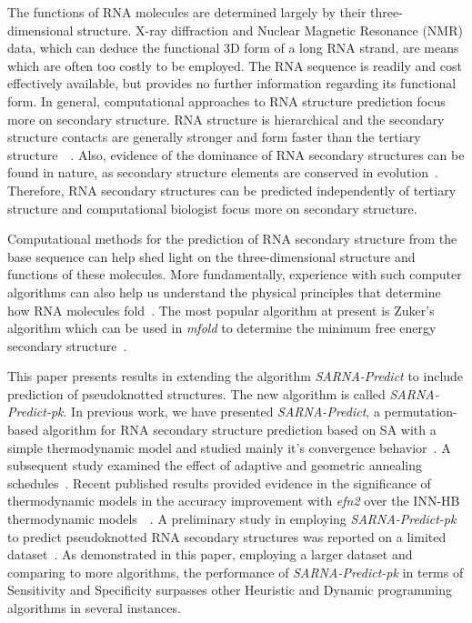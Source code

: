 \documentclass{doublecol-new}
\theoremstyle{TH}{
\newtheorem{lemma}{Lemma}
\newtheorem{theorem}[lemma]{Theorem}
\newtheorem{corrolary}[lemma]{Corrolary}
\newtheorem{conjecture}[lemma]{Conjecture}
\newtheorem{proposition}[lemma]{Proposition}
\newtheorem{claim}[lemma]{Claim}
\newtheorem{stheorem}[lemma]{Wrong Theorem}
\newtheorem{algorithm}{Algorithm}
}
\theoremstyle{THrm}{
\newtheorem{definition}{Definition}
\newtheorem{question}{Question}
\newtheorem{remark}{Remark}
\newtheorem{scheme}{Scheme}
}
\theoremstyle{THhit}{
\newtheorem{case}{Case}[section]
}
\begin{document}
The functions of RNA molecules are determined largely by their
three-dimensional structure. X-ray diffraction and Nuclear Magnetic Resonance
(NMR) data, which can deduce the functional 3D form of a long RNA strand,
are means which are often too costly to be employed.
The RNA sequence is readily
and cost effectively available, but provides no further information regarding its functional form.
In general, computational approaches to RNA structure prediction focus more on secondary structure. 
RNA structure is hierarchical and the secondary structure contacts
are generally stronger and form faster than the tertiary structure~\cite{tinoco_1999}~\cite{mathews_2006}.
Also, evidence of the dominance of RNA secondary structures can be found in
nature, as secondary structure elements are conserved in evolution~\cite{gr96analysis}.
Therefore, RNA secondary structures can be predicted independently of tertiary structure 
and computational biologist focus more on secondary structure.

Computational methods for the prediction of RNA secondary structure from the base sequence
can help shed light on the three-dimensional structure and functions of these
molecules. More fundamentally, experience with such computer algorithms can also help
us understand the physical principles that determine how RNA molecules
fold~\cite{tinoco_1999}.
The most popular algorithm at present is Zuker's algorithm which can be used
in {\em mfold} to determine the minimum free energy secondary structure~\cite{zuker_2003}.

This paper presents results in extending the algorithm {\em SARNA-Predict} to
include prediction of pseudoknotted structures. The new algorithm is
called {\em SARNA-Predict-pk}.
In previous work, we have presented {\em SARNA-Predict}, a permutation-based algorithm for RNA secondary structure
prediction based on SA with a simple thermodynamic model and studied mainly it's
convergence behavior~\cite{tsang_2006}. A subsequent study examined the effect of adaptive and geometric
annealing schedules~\cite{tsang_2007}. Recent published results provided evidence
in the significance of thermodynamic models in the accuracy improvement with {\em efn2} over the INN-HB
thermodynamic models~\cite{tsang_2007_cec}~\cite{tsang_tcbb_2010}.
A preliminary study in employing {\em SARNA-Predict-pk} to predict pseudoknotted RNA secondary structures
was reported on a limited dataset~\cite{tsang_cibcb_2008}. 
As demonstrated in this paper, employing a larger dataset and comparing to more algorithms, the performance of {\em SARNA-Predict-pk} in
terms of Sensitivity and Specificity
surpasses other Heuristic and Dynamic
programming algorithms in several instances.
\end{document}
